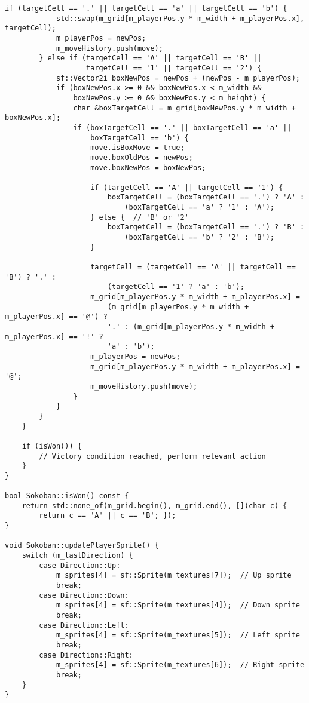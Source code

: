 \documentclass[12pt]{article}
\begin{document}
\begin{lstlisting}[style=cppcode]
        if (targetCell == '.' || targetCell == 'a' || targetCell == 'b') {
            std::swap(m_grid[m_playerPos.y * m_width + m_playerPos.x], targetCell);
            m_playerPos = newPos;
            m_moveHistory.push(move);
        } else if (targetCell == 'A' || targetCell == 'B' ||
                   targetCell == '1' || targetCell == '2') {
            sf::Vector2i boxNewPos = newPos + (newPos - m_playerPos);
            if (boxNewPos.x >= 0 && boxNewPos.x < m_width &&
                boxNewPos.y >= 0 && boxNewPos.y < m_height) {
                char &boxTargetCell = m_grid[boxNewPos.y * m_width + boxNewPos.x];
                if (boxTargetCell == '.' || boxTargetCell == 'a' ||
                    boxTargetCell == 'b') {
                    move.isBoxMove = true;
                    move.boxOldPos = newPos;
                    move.boxNewPos = boxNewPos;

                    if (targetCell == 'A' || targetCell == '1') {
                        boxTargetCell = (boxTargetCell == '.') ? 'A' :
                            (boxTargetCell == 'a' ? '1' : 'A');
                    } else {  // 'B' or '2'
                        boxTargetCell = (boxTargetCell == '.') ? 'B' :
                            (boxTargetCell == 'b' ? '2' : 'B');
                    }

                    targetCell = (targetCell == 'A' || targetCell == 'B') ? '.' :
                        (targetCell == '1' ? 'a' : 'b');
                    m_grid[m_playerPos.y * m_width + m_playerPos.x] =
                        (m_grid[m_playerPos.y * m_width + m_playerPos.x] == '@') ?
                        '.' : (m_grid[m_playerPos.y * m_width + m_playerPos.x] == '!' ?
                        'a' : 'b');
                    m_playerPos = newPos;
                    m_grid[m_playerPos.y * m_width + m_playerPos.x] = '@';
                    m_moveHistory.push(move);
                }
            }
        }
    }

    if (isWon()) {
        // Victory condition reached, perform relevant action
    }
}

bool Sokoban::isWon() const {
    return std::none_of(m_grid.begin(), m_grid.end(), [](char c) {
        return c == 'A' || c == 'B'; });
}

void Sokoban::updatePlayerSprite() {
    switch (m_lastDirection) {
        case Direction::Up:
            m_sprites[4] = sf::Sprite(m_textures[7]);  // Up sprite
            break;
        case Direction::Down:
            m_sprites[4] = sf::Sprite(m_textures[4]);  // Down sprite
            break;
        case Direction::Left:
            m_sprites[4] = sf::Sprite(m_textures[5]);  // Left sprite
            break;
        case Direction::Right:
            m_sprites[4] = sf::Sprite(m_textures[6]);  // Right sprite
            break;
    }
}


\end{lstlisting}
\end{document}
